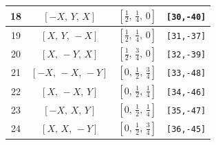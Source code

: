 \documentclass[fleqn,8pt]{jsarticle}
\begin{document}
\begin{longtable}{cccc}
18 & $\left[ - X,\, Y,\, X \right]$ & $\left[ \frac{1}{2},\, \frac{1}{4},\, 0 \right]$ & {\tt [30,-40]} \\ \hline
19 & $\left[ X,\, Y,\, - X \right]$ & $\left[ \frac{1}{2},\, \frac{1}{4},\, 0 \right]$ & {\tt [31,-37]} \\ \hline
20 & $\left[ X,\, - Y,\, X \right]$ & $\left[ \frac{1}{2},\, \frac{3}{4},\, 0 \right]$ & {\tt [32,-39]} \\ \hline
21 & $\left[ - X,\, - X,\, - Y \right]$ & $\left[ 0,\, \frac{1}{2},\, \frac{3}{4} \right]$ & {\tt [33,-48]} \\ \hline
22 & $\left[ X,\, - X,\, Y \right]$ & $\left[ 0,\, \frac{1}{2},\, \frac{1}{4} \right]$ & {\tt [34,-46]} \\ \hline
23 & $\left[ - X,\, X,\, Y \right]$ & $\left[ 0,\, \frac{1}{2},\, \frac{1}{4} \right]$ & {\tt [35,-47]} \\ \hline
24 & $\left[ X,\, X,\, - Y \right]$ & $\left[ 0,\, \frac{1}{2},\, \frac{3}{4} \right]$ & {\tt [36,-45]} \\
\end{longtable}
\renewcommand{\arraystretch}{1.2}
\end{document}

